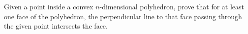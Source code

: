 Given a point inside a convex $n$-dimensional polyhedron,
prove that for at least one face of the polyhedron,
the perpendicular line to that face passing through the given point
intersects the face.
